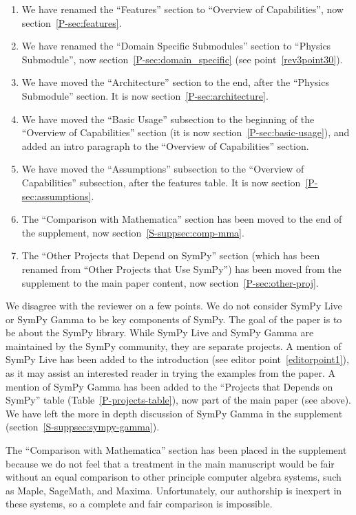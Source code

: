 \documentclass[answers,12pt]{exam}
\begin{document}
\begin{questions}
\begin{solution}
  \begin{enumerate}
  \item We have renamed the ``Features'' section to ``Overview of
    Capabilities'', now section~\ref{P-sec:features}.
  \item We have renamed the ``Domain Specific Submodules'' section to
      ``Physics Submodule'', now section~\ref{P-sec:domain_specific} (see point~\ref{rev3point30}).
  \item We have moved the ``Architecture'' section to the end, after the
    ``Physics Submodule'' section. It is now section~\ref{P-sec:architecture}.
  \item We have moved the ``Basic Usage'' subsection to the beginning of the
    ``Overview of Capabilities'' section (it is now section~\ref{P-sec:basic-usage}), and added an intro paragraph to the
    ``Overview of Capabilities'' section.
  \item We have moved the ``Assumptions'' subsection to the ``Overview of
    Capabilities'' subsection, after the features table. It is now section~\ref{P-sec:assumptions}.
  \item The ``Comparison with Mathematica'' section has been moved to the end of
    the supplement, now section~\ref{S-suppsec:comp-mma}.
  \item The ``Other Projects that
      Depend on SymPy'' section (which has been renamed from ``Other Projects that
      Use SymPy'') has been moved from the supplement to the main paper
      content, now section~\ref{P-sec:other-proj}.
  \end{enumerate}

We disagree with the reviewer on a few points. We do not consider SymPy Live
or SymPy Gamma to be key components of SymPy. The goal of the paper is
to be about the SymPy library. While SymPy Live and SymPy Gamma are
maintained by the SymPy community, they are separate projects. A
mention of SymPy Live has been added to the introduction (see editor
point~\ref{editorpoint1}), as it may assist an interested reader in trying the
examples from the paper. A mention of SymPy Gamma has been added to the ``Projects that
Depends on SymPy'' table (Table~\ref{P-projects-table}), now part of the main
paper (see above). We have
left the more in depth discussion of SymPy Gamma in the supplement (section~\ref{S-suppsec:sympy-gamma}).

The ``Comparison with Mathematica'' section has been placed in the supplement
because we do not feel that a treatment in the main manuscript would be fair
without an equal comparison to other principle computer algebra systems, such
as Maple, SageMath, and Maxima. Unfortunately, our authorship is inexpert in
these systems, so a complete and fair comparison is impossible.


\end{solution}
\end{questions}
\end{document}

